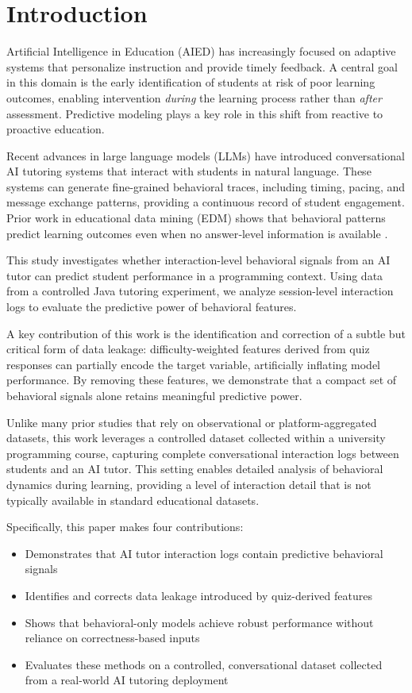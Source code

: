 \documentclass[conference]{IEEEtran}
\begin{document}
\section{Introduction}

Artificial Intelligence in Education (AIED) has increasingly focused on adaptive systems that personalize instruction and provide timely feedback. A central goal in this domain is the early identification of students at risk of poor learning outcomes, enabling intervention \textit{during} the learning process rather than \textit{after} assessment. Predictive modeling plays a key role in this shift from reactive to proactive education.

Recent advances in large language models (LLMs) have introduced conversational AI tutoring systems that interact with students in natural language. These systems can generate fine-grained behavioral traces, including timing, pacing, and message exchange patterns, providing a continuous record of student engagement. Prior work in educational data mining (EDM) shows that behavioral patterns predict learning outcomes even when no answer‑level information is available \cite{encyclopedia4040108}.

This study investigates whether interaction-level behavioral signals from an AI tutor can predict student performance in a programming context. Using data from a controlled Java tutoring experiment, we analyze session-level interaction logs to evaluate the predictive power of behavioral features.

A key contribution of this work is the identification and correction of a subtle but critical form of data leakage: difficulty-weighted features derived from quiz responses can partially encode the target variable, artificially inflating model performance. By removing these features, we demonstrate that a compact set of behavioral signals alone retains meaningful predictive power.

Unlike many prior studies that rely on observational or platform-aggregated datasets, this work leverages a controlled dataset collected within a university programming course, capturing complete conversational interaction logs between students and an AI tutor. This setting enables detailed analysis of behavioral dynamics during learning, providing a level of interaction detail that is not typically available in standard educational datasets.

Specifically, this paper makes four contributions:

\begin{itemize}
    \item Demonstrates that AI tutor interaction logs contain predictive behavioral signals
    \item Identifies and corrects data leakage introduced by quiz-derived features
    \item Shows that behavioral-only models achieve robust performance without reliance on correctness-based inputs
    \item Evaluates these methods on a controlled, conversational dataset collected from a real-world AI tutoring deployment
\end{itemize}
\end{document}
